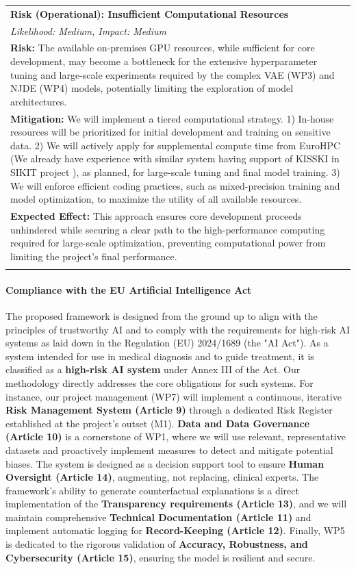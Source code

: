 \documentclass[11pt, a4paper]{article}
\begin{document}
\begin{longtable}{p{}}
\textbf{Risk (Operational): Insufficient Computational Resources} \\
\textit{Likelihood: Medium, Impact: Medium} \\
\textbf{Risk:} The available on-premises GPU resources, while sufficient for core development, may become a bottleneck for the extensive hyperparameter tuning and large-scale experiments required by the complex VAE (WP3) and NJDE (WP4) models, potentially limiting the exploration of model architectures. \\
\textbf{Mitigation:} We will implement a tiered computational strategy. 1) In-house resources will be prioritized for initial development and training on sensitive data. 2) We will actively apply for supplemental compute time from EuroHPC (We already have experience with similar system having support of KISSKI in SIKIT project \cite{gwdgKISSKIService}  ), as planned, for large-scale tuning and final model training. 3) We will enforce efficient coding practices, such as mixed-precision training and model optimization, to maximize the utility of all available resources. \\
\textbf{Expected Effect:} This approach ensures core development proceeds unhindered while securing a clear path to the high-performance computing required for large-scale optimization, preventing computational power from limiting the project's final performance. \\
\addlinespace
\bottomrule

\end{longtable}

\paragraph{Compliance with the EU Artificial Intelligence Act}
The proposed framework is designed from the ground up to align with the principles of trustworthy AI and to comply with the requirements for high-risk AI systems as laid down in the Regulation (EU) 2024/1689 (the "AI Act"). As a system intended for use in medical diagnosis and to guide treatment, it is classified as a \textbf{high-risk AI system} under Annex III of the Act. Our methodology directly addresses the core obligations for such systems. For instance, our project management (WP7) will implement a continuous, iterative \textbf{Risk Management System (Article 9)} through a dedicated Risk Register established at the project's outset (M1). \textbf{Data and Data Governance (Article 10)} is a cornerstone of WP1, where we will use relevant, representative datasets and proactively implement measures to detect and mitigate potential biases. The system is designed as a decision support tool to ensure \textbf{Human Oversight (Article 14)}, augmenting, not replacing, clinical experts. The framework's ability to generate counterfactual explanations is a direct implementation of the \textbf{Transparency requirements (Article 13)}, and we will maintain comprehensive \textbf{Technical Documentation (Article 11)} and implement automatic logging for \textbf{Record-Keeping (Article 12)}. Finally, WP5 is dedicated to the rigorous validation of \textbf{Accuracy, Robustness, and Cybersecurity (Article 15)}, ensuring the model is resilient and secure.
\end{document}
